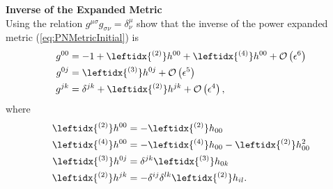 \begin{exercise}
\textbf{Inverse of the Expanded Metric}\\
Using the relation $g^{\mu \sigma} g_{\sigma \nu} = \delta^\mu _\nu$ show that the inverse of the power expanded metric (\ref{eq:PNMetricInitial}) is
\begin{subequations}
\begin{align}
g^{00} &= -1 + \leftidx{^{(2)}}h^{00} + \leftidx{^{(4)}}h^{00} + \mathcal{O} \left( \epsilon^6 \right) \\
g^{0j} &= \leftidx{^{(3)}}h^{0j} +  \mathcal{O} \left( \epsilon^5 \right)  \\
g^{jk} &= \delta^{jk} + \leftidx{^{(2)}}h^{jk} + \mathcal{O} \left( \epsilon^4 \right) ,
\end{align}
\end{subequations}
where
\begin{subequations}
\begin{align}
\leftidx{^{(2)}}h^{00} &= -  \leftidx{^{(2)}}h_{00} \\
\leftidx{^{(4)}}h^{00} &= -  \leftidx{^{(4)}}h_{00} - \leftidx{^{(2)}}h_{00}^2\\
\leftidx{^{(3)}}h^{0j} &=   \delta ^{jk} \leftidx{^{(3)}}h_{0k} \\
\leftidx{^{(2)}}h^{jk} &= - \delta ^{ij} \delta^{lk} \leftidx{^{(2)}}h_{il} .
\end{align}
\end{subequations}
\end{exercise}

